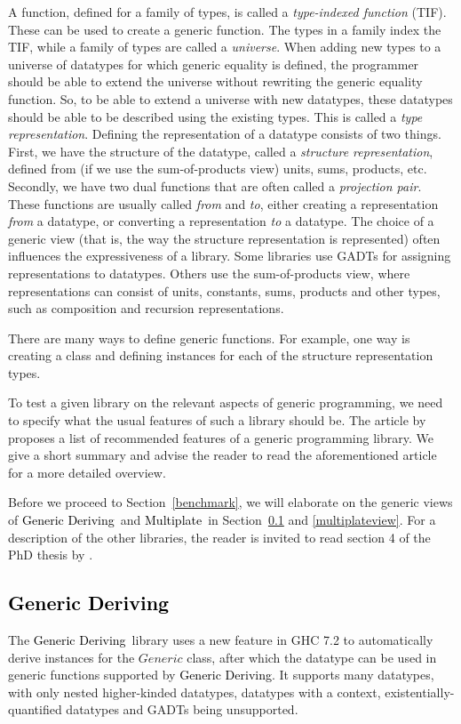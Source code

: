 \documentclass[twocolumn,11pt,a4paper]{article}
\newcommand{\sref}[1]{Section~\ref{#1}}
\newcommand{\multiplate}{\textcolor{black}{Multiplate}}
\newcommand{\genericderiving}{\textcolor{black}{Generic Deriving}}
\begin{document}
A function, defined for a family of types, is called a \textit{type-indexed function} (TIF). These can be used to create a generic function.
The types in a family index the TIF, while a family of types are called a \textit{universe}.
When adding new types to a universe of datatypes for which generic equality is defined, the programmer should be able to extend the universe without rewriting the generic equality function.
So, to be able to extend a universe with new datatypes, these datatypes should be able to be described using the existing types. This is called a \textit{type representation}.
Defining the representation of a datatype consists of two things.
First, we have the structure of the datatype, called a \textit{structure representation}, defined from (if we use the sum-of-products view) units, sums, products, etc.
Secondly, we have two dual functions that are often called a \textit{projection pair}. 
These functions are usually called \textit{from} and \textit{to}, either creating a representation \textit{from} a datatype, or converting a representation \textit{to} a datatype.
The choice of a generic view (that is, the way the structure representation is represented) often influences the expressiveness of a library.
Some libraries use GADTs for assigning representations to datatypes. 
Others use the sum-of-products view, where representations can consist of units, constants, sums, products and other types, such as composition and recursion representations.

There are many ways to define generic functions. For example, one way is creating a class and defining instances for each of the structure representation types.


To test a given library on the relevant aspects of generic programming, we need to specify what the usual features of such a library should be.
The article by \citet{Rodriguez:2008:art} proposes a list of recommended features of a generic programming library. We give a short summary and advise the reader to read the aforementioned article for a more detailed overview.

Before we proceed to \sref{benchmark}, we will elaborate on the generic views of \genericderiving\ and \multiplate\ in \sref{genericderivingview} and \ref{multiplateview}. For a description of the other libraries, the reader is invited to read section 4 of the PhD thesis by \citet{Rodriguez:2009:phd} .

\subsection{\genericderiving}\label{genericderivingview}
The \genericderiving\ library uses a new feature in GHC 7.2 to automatically derive instances for the $ Generic $ class, after which the datatype can be used in generic functions supported by \genericderiving. 
It supports many datatypes, with only nested higher-kinded datatypes, datatypes with a context, existentially-quantified datatypes and GADTs being unsupported.
\end{document}
